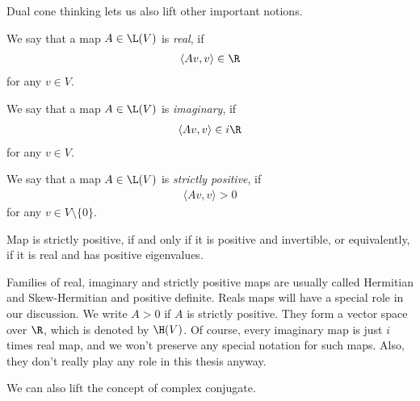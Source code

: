 Dual cone thinking lets us also lift other important notions.

\begin{maar}
	We say that a map $A \in \L(V)$ is \textit{real}, if
	\begin{align*}
		\langle A v, v \rangle \in \R
	\end{align*}
	for any $v \in V$.
\end{maar}

\begin{maar}
	We say that a map $A \in \L(V)$ is \textit{imaginary}, if
	\begin{align*}
		\langle A v, v \rangle \in i \R
	\end{align*}
	for any $v \in V$.
\end{maar}

\begin{maar}
	We say that a map $A \in \L(V)$ is \textit{strictly positive}, if
	\begin{align*}
		\langle A v, v \rangle > 0
	\end{align*}
	for any $v \in V \setminus \{0\}$.
\end{maar}

Map is strictly positive, if and only if it is positive and invertible, or equivalently, if it is real and has positive eigenvalues.

Families of real, imaginary and strictly positive maps are usually called Hermitian and Skew-Hermitian and positive definite. Reals maps will have a special role in our discussion. We write $A > 0$ if $A$ is strictly positive. They form a vector space over $\R$, which is denoted by $\H(V)$. Of course, every imaginary map is just $i$ times real map, and we won't preserve any special notation for such maps. Also, they don't really play any role in this thesis anyway.

We can also lift the concept of complex conjugate.

